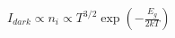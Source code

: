 \documentclass[preview, border=8pt, 12pt]{standalone}
\begin{document}
$\displaystyle 
I_{dark} \propto n_i \propto T^{3/2} \exp\left(-\frac{E_g}{2kT}\right)
$
\end{document}
